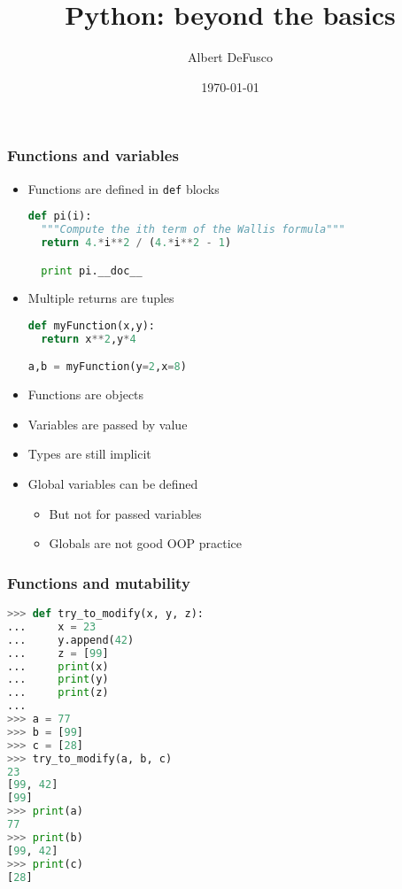 \documentclass[xcolor=table,10pt,final]{beamer}
\begin{document}
\title{Python: beyond the basics}
\author{Albert DeFusco}
\date{\today}


\frame{\titlepage}

\begin{frame}[fragile]
  \frametitle{Functions and variables}
  \begin{itemize}
    \item Functions are defined in {\tt def} blocks\\
      \begin{lstlisting}[language=python]
def pi(i):
  """Compute the ith term of the Wallis formula"""
  return 4.*i**2 / (4.*i**2 - 1)

  print pi.__doc__
      \end{lstlisting}
    \item Multiple returns are tuples\\
      \begin{lstlisting}[language=python]
def myFunction(x,y):
  return x**2,y*4

a,b = myFunction(y=2,x=8)
      \end{lstlisting}
    \item Functions are objects
    \item Variables are passed by value
    \item Types are still implicit
    \item Global variables can be defined
      \begin{itemize}
        \item But not for passed variables
        \item Globals are not good OOP practice
      \end{itemize}
  \end{itemize}
\end{frame}

\begin{frame}[fragile]
  \frametitle{Functions and mutability}
  \begin{lstlisting}[language=python]
>>> def try_to_modify(x, y, z):
...     x = 23
...     y.append(42)
...     z = [99]
...     print(x)
...     print(y)
...     print(z)
...
>>> a = 77
>>> b = [99]
>>> c = [28]
>>> try_to_modify(a, b, c)
23
[99, 42]
[99]
>>> print(a)
77
>>> print(b)
[99, 42]
>>> print(c)
[28]
  \end{lstlisting}
\end{frame}
\end{document}
